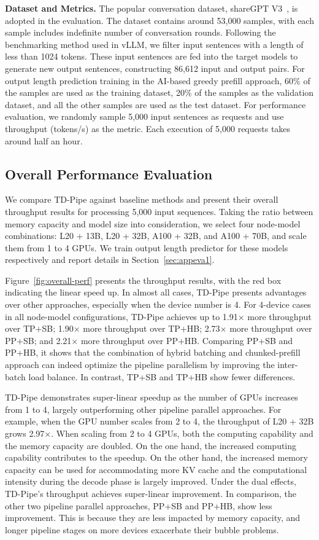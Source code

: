 \noindent \textbf{Dataset and Metrics.}
The popular conversation dataset, shareGPT V3~\cite{hfshareGPT}, is adopted in the evaluation.
The dataset contains around 53,000 samples, with each sample includes indefinite number of conversation rounds.
Following the benchmarking method used in vLLM, we filter input sentences with a length of less than 1024 tokens.
These input sentences are fed into the target models to generate new output sentences, constructing 86,612 input and output pairs.
For output length prediction training in the AI-based greedy prefill approach, 60\% of the samples are used as the training dataset, 20\% of the samples as the validation dataset, and all the other samples are used as the test dataset.
For performance evaluation, we randomly sample 5,000 input sentences as requests and use throughput (tokens/s) as the metric. 
Each execution of 5,000 requests takes around half an hour.

\subsection{Overall Performance Evaluation}

We compare TD-Pipe against baseline methods and present their overall throughput results for processing 5,000 input sequences.
Taking the ratio between memory capacity and model size into consideration, we select four node-model combinations: L20 + 13B, L20 + 32B, A100 + 32B, and A100 + 70B, and scale them from 1 to 4 GPUs.
We train output length predictor for these models respectively and report details in Section~\ref{sec:appeva1}.

Figure~\ref{fig:overall-perf} presents the throughput results, with the red box indicating the linear speed up.
In almost all cases, TD-Pipe presents advantages over other approaches, especially when the device number is 4.
For 4-device cases in all node-model configurations, TD-Pipe achieves up to 1.91$\times$ more throughput over TP+SB; 1.90$\times$ more throughput over TP+HB; 2.73$\times$ more throughput over PP+SB; and 2.21$\times$ more throughput over PP+HB.
Comparing PP+SB and PP+HB, it shows that the combination of hybrid batching and chunked-prefill approach can indeed optimize the pipeline parallelism by improving the inter-batch load balance. In contrast, TP+SB and TP+HB show fewer differences.

TD-Pipe demonstrates super-linear speedup as the number of GPUs increases from 1 to 4, largely outperforming other pipeline parallel approaches.
For example, when the GPU number scales from 2 to 4, the throughput of L20 + 32B grows 2.97$\times$.
When scaling from 2 to 4 GPUs, both the computing capability and the memory capacity are doubled.
On the one hand, the increased computing capability contributes to the speedup.
On the other hand, the increased memory capacity can be used for accommodating more KV cache and the computational intensity during the decode phase is largely improved.
Under the dual effects, TD-Pipe's throughput achieves super-linear improvement.
In comparison, the other two pipeline parallel approaches, PP+SB and PP+HB, show less improvement. This is because they are less impacted by memory capacity, and longer pipeline stages on more devices exacerbate their bubble problems.

